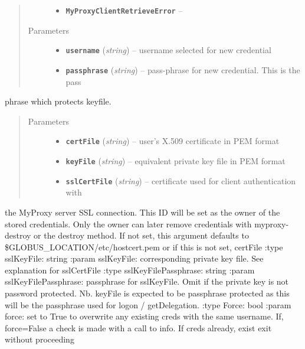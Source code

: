 \documentclass[letterpaper,10pt,english]{sphinxmanual}
\begin{document}
\begin{fulllineitems}
\begin{fulllineitems}
\begin{quote}
\begin{description}
\begin{itemize}
\item {} 
\textbf{\texttt{MyProxyClientRetrieveError}} -- 

\end{itemize}

\item[{Parameters}] \leavevmode\begin{itemize}
\item {} 
\textbf{\texttt{username}} (\emph{string}) -- username selected for new credential

\item {} 
\textbf{\texttt{passphrase}} (\emph{string}) -- pass-phrase for new credential.  This is the pass

\end{itemize}

\end{description}\end{quote}

phrase which protects keyfile.
\begin{quote}\begin{description}
\item[{Parameters}] \leavevmode\begin{itemize}
\item {} 
\textbf{\texttt{certFile}} (\emph{string}) -- user's X.509 certificate in PEM format

\item {} 
\textbf{\texttt{keyFile}} (\emph{string}) -- equivalent private key file in PEM format

\item {} 
\textbf{\texttt{sslCertFile}} (\emph{string}) -- certificate used for client authentication with

\end{itemize}

\end{description}\end{quote}

the MyProxy server SSL connection.  This ID will be set as the owner
of the stored credentials.  Only the owner can later remove 
credentials with myproxy-destroy or the destroy method.  If not set,
this argument defaults to \$GLOBUS\_LOCATION/etc/hostcert.pem or if this
is not set, certFile
:type sslKeyFile: string
:param sslKeyFile: corresponding private key file.  See explanation
for sslCertFile
:type sslKeyFilePassphrase: string 
:param sslKeyFilePassphrase: passphrase for sslKeyFile.  Omit if the
private key is not password protected.  Nb. keyFile is expected to
be passphrase protected as this will be the passphrase used for
logon / getDelegation.
:type Force: bool
:param force: set to True to overwrite any existing creds with the
same username.  If, force=False a check is made with a call to info.
If creds already, exist exit without proceeding


\end{fulllineitems}
\end{fulllineitems}
\end{document}
